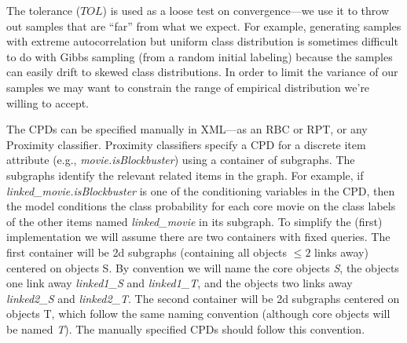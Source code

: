 \documentclass[11pt]{article}
\begin{document}
The tolerance ($TOL$) is used as a loose test on convergence---we use it to throw out samples that are ``far'' from what we expect. For example, generating samples with extreme autocorrelation but uniform class distribution is sometimes difficult to do with Gibbs sampling (from a random initial labeling) because the samples can easily drift to skewed class distributions. In order to limit the variance of our samples we may want to constrain the range of empirical distribution we're willing to accept.

The CPDs can be specified manually in XML---as an RBC or RPT, or any Proximity classifier. Proximity classifiers specify a CPD for a discrete item attribute (e.g., \emph{movie.isBlockbuster}) using a container of subgraphs. The subgraphs identify the relevant related items in the graph. For example, if \emph{linked\_movie.isBlockbuster} is one of the conditioning variables in the CPD, then the model conditions the class probability for each core movie on the class labels of the other items named \emph{linked\_movie} in its subgraph. To simplify the (first) implementation we will assume there are two containers with fixed queries. The first container will be 2d subgraphs (containing all objects $\leq 2$ links away) centered on objects S. By convention we will name the core objects \emph{S}, the objects one link away \emph{linked1\_S} and \emph{linked1\_T}, and the objects two links away \emph{linked2\_S} and \emph{linked2\_T}. The second container will be 2d subgraphs centered on objects T, which follow the same naming convention (although core objects will be named \emph{T}). The manually specified CPDs should follow this convention.
\end{document}
